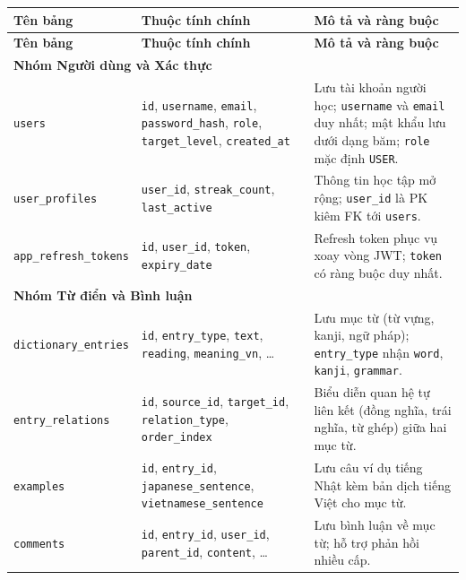 \documentclass[../DoAn.tex]{subfiles}
\begin{document}
\begin{longtable}{|p{3.8cm}|p{4.3cm}|p{5.8cm}|}
\hline
\textbf{Tên bảng} & \textbf{Thuộc tính chính} & \textbf{Mô tả và ràng buộc} \\
\hline
\endfirsthead
\hline
\textbf{Tên bảng} & \textbf{Thuộc tính chính} & \textbf{Mô tả và ràng buộc} \\
\hline
\endhead

\multicolumn{3}{|l|}{\textbf{Nhóm Người dùng và Xác thực}} \\
\hline
\texttt{users} & \texttt{id}, \texttt{username}, \texttt{email}, \texttt{password\_hash}, \texttt{role}, \texttt{target\_level}, \texttt{created\_at} & Lưu tài khoản người học; \texttt{username} và \texttt{email} duy nhất; mật khẩu lưu dưới dạng băm; \texttt{role} mặc định \texttt{USER}. \\
\hline
\texttt{user\_\allowbreak profiles} & \texttt{user\_id}, \texttt{streak\_count}, \texttt{last\_active} & Thông tin học tập mở rộng; \texttt{user\_id} là PK kiêm FK tới \texttt{users}. \\
\hline
\texttt{app\_\allowbreak refresh\_\allowbreak tokens} & \texttt{id}, \texttt{user\_id}, \texttt{token}, \texttt{expiry\_date} & Refresh token phục vụ xoay vòng JWT; \texttt{token} có ràng buộc duy nhất. \\
\hline

\multicolumn{3}{|l|}{\textbf{Nhóm Từ điển và Bình luận}} \\
\hline
\texttt{dictionary\_\allowbreak entries} & \texttt{id}, \texttt{entry\_type}, \texttt{text}, \texttt{reading}, \texttt{meaning\_vn}, \dots & Lưu mục từ (từ vựng, kanji, ngữ pháp); \texttt{entry\_type} nhận \texttt{word}, \texttt{kanji}, \texttt{grammar}. \\
\hline
\texttt{entry\_\allowbreak relations} & \texttt{id}, \texttt{source\_id}, \texttt{target\_id}, \texttt{relation\_type}, \texttt{order\_index} & Biểu diễn quan hệ tự liên kết (đồng nghĩa, trái nghĩa, từ ghép) giữa hai mục từ. \\
\hline
\texttt{examples} & \texttt{id}, \texttt{entry\_id}, \texttt{japanese\_sentence}, \texttt{vietnamese\_sentence} & Lưu câu ví dụ tiếng Nhật kèm bản dịch tiếng Việt cho mục từ. \\
\hline
\texttt{comments} & \texttt{id}, \texttt{entry\_id}, \texttt{user\_id}, \texttt{parent\_id}, \texttt{content}, \dots & Lưu bình luận về mục từ; hỗ trợ phản hồi nhiều cấp. \\
\hline


\end{longtable}
\end{document}
